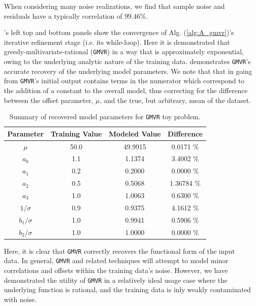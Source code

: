 \documentclass[twocolumn,aps,prd,floatfix,preprintnumbers,a4paper,nofootinbib,
superscriptaddress,10pt]{revtex4-1}
\def\gmvr#1{greedy-multivariate-rational#1
  (\texttt{GMVR}#1)\gdef\gmvr{\texttt{GMVR}}}
\begin{document}
%
When considering many noise realizations, we find that sample noise and residuals have a typically correlation of $99.46\%$.
%
\par {}'s left top and bottom panels show the convergence of Alg. (\ref{alg:A_gmvr})'s iterative refinement stage (i.e. its while-loop).
%
Here it is demonstrated that \gmvr{} in a way that is approximately exponential, owing to the underlying analytic nature of the training data.
%
 demonstrates \gmvr{}'s accurate recovery of the underlying model parameters. We note that that in going from \gmvr{}'s initial output contains terms in the numerator which correspond to the addition of a constant to the overall model, thus correcting for the difference between the offset parameter, $\mu$, and the true, but arbitrary, mean of the dataset.
%
%
%
\begin{table}
  \caption{Summary of recovered model parameters for \gmvr{} toy problem.}
  \label{tb:gmvrtoy}
  \begin{tabular}{|c|c|c|c|}
    \hline
    \hline
    Parameter & Training Value & Modeled Value & Difference \\ \hline \hline
    $\mu$ & 50.0 & 49.9915 & 0.0171 \% \\ \hline
    $a_0$ & 1.1 & 1.1374 & 3.4002 \% \\ \hline
    $a_1$ & 0.2 & 0.2000 & 0.0000 \% \\ \hline
    $a_2$ & 0.5 & 0.5068 & 1.36784 \% \\ \hline
    $a_3$ & 1.0 & 1.0063 & 0.6300 \% \\ \hline
    $1/\sigma$ & 0.9 & 0.9375 & 4.1612 \% \\ \hline
    $b_1/\sigma$ & 1.0 & 0.9941 & 0.5906 \% \\ \hline
    $b_2/\sigma$ & 1.0 & 1.0000 & 0.0000 \% \\ \hline
    \hline
  \end{tabular}

\end{table}
%
%
\par Here, it is clear that \gmvr{} correctly recovers the functional form of the input data. In general, \gmvr{} and related techniques will attempt to model minor correlations and offsets within the training data's noise.
%
However, we have demonstrated the utility of \gmvr{} in a relatively ideal usage case where the underlying function is rational, and the training data is inly weakly contaminated with noise.
\end{document}
